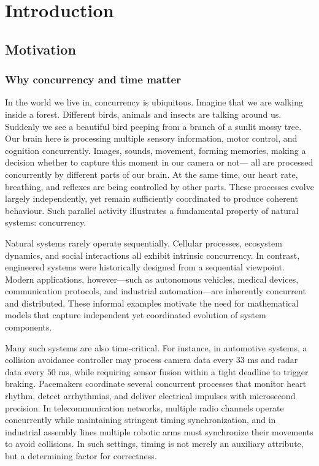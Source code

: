 
\chapter{Introduction}

\section{Motivation}

\subsection{Why concurrency and time matter}

In the world we live in, concurrency is ubiquitous. Imagine that we are walking inside a forest. Different birds, animals and insects are talking around us. Suddenly we see a beautiful bird peeping from a branch of a sunlit mossy tree. Our brain here is processing multiple sensory information, motor control, and cognition concurrently. Images, sounds, movement, forming memories, making a decision whether to capture this moment in our camera or not--- all are processed concurrently by different parts of our brain. At the same time, our heart rate, breathing, and reflexes are being controlled by other parts. These processes evolve largely independently, yet remain sufficiently coordinated to produce coherent behaviour. Such parallel activity illustrates a fundamental property of natural systems: concurrency. 

Natural systems rarely operate sequentially. Cellular processes, ecosystem dynamics, and social interactions all exhibit intrinsic concurrency. In contrast, engineered systems were historically designed from a sequential viewpoint. Modern applications, however—such as autonomous vehicles, medical devices, communication protocols, and industrial automation—are inherently concurrent and distributed. These informal examples motivate the need for mathematical models that capture independent yet coordinated evolution of system components.

Many such systems are also time-critical. For instance, in automotive systems, a collision avoidance controller may process camera data every \(33\) ms and radar data every \(50\) ms, while requiring sensor fusion within a tight deadline to trigger braking. Pacemakers coordinate several concurrent processes that monitor heart rhythm, detect arrhythmias, and deliver electrical impulses with microsecond precision. In telecommunication networks, multiple radio channels operate concurrently while maintaining stringent timing synchronization, and in industrial assembly lines multiple robotic arms must synchronize their movements to avoid collisions. In such settings, timing is not merely an auxiliary attribute, but a determining factor for correctness.


